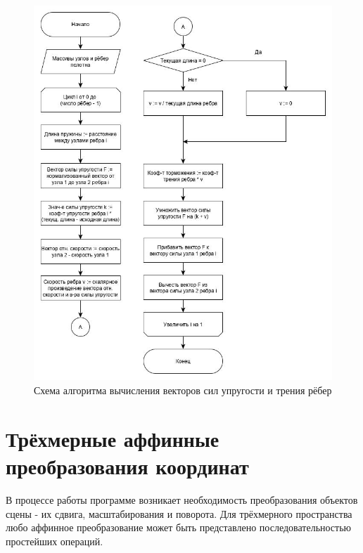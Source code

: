 \begin{figure}[ht!]
	\centering
	\includegraphics[scale=0.65]{pos_spring.jpg}
	\caption{Схема алгоритма вычисления векторов сил упругости и трения рёбер}
	\label{fig:pos_spring}
\end{figure}

\pagebreak

\section{Трёхмерные аффинные преобразования координат}
\hspace{0.6cm}В процессе работы программе возникает необходимость преобразования объектов сцены - их сдвига, масштабирования и поворота. Для трёхмерного пространства любо аффинное преобразование может быть представлено последовательностью простейших операций.

